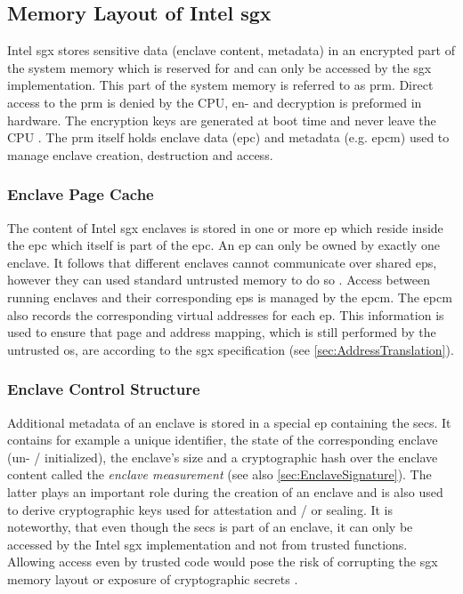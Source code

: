\subsection{Memory Layout of Intel \ac{sgx}}
Intel \ac{sgx} stores sensitive data (enclave content, metadata) in an encrypted part of the system memory which is reserved for and can only be accessed by the \ac{sgx} 
implementation. This part of the system memory is referred to as \ac{prm}. Direct access to the \ac{prm} is denied by the CPU, en- and decryption 
is preformed in hardware. The encryption keys are generated at boot time and never leave the CPU \cite{IntelSGXExplanation}. The \ac{prm} itself holds enclave data (\ac{epc}) and metadata (e.g. \ac{epcm}) used to manage enclave creation, destruction and access.

\subsubsection{Enclave Page Cache}
The content of Intel \ac{sgx} enclaves is stored in one or more \ac{ep} which reside inside the \ac{epc} which itself is part of the \ac{epc}. An \ac{ep}
can only be owned by exactly one enclave. It follows that different enclaves cannot communicate over shared \acp{ep}, however they can used standard untrusted memory to
do so \cite{Costan2016IntelSE}. Access between running enclaves and their corresponding \acp{ep} is managed by the \ac{epcm}. The \ac{epcm} also records
the corresponding virtual addresses for each \ac{ep}. This information is used to ensure that page and address mapping, which is still performed by the untrusted \ac{os}, 
are according to the \ac{sgx} specification (see \cref{sec:AddressTranslation}). 

\subsubsection{Enclave Control Structure}
Additional metadata of an enclave is stored in a special \ac{ep} containing the \ac{secs}. It contains for example a unique identifier, the
state of the corresponding enclave (un- / initialized), the enclave's size and a cryptographic hash over the enclave content called the \textit{enclave measurement} (see
also \cref{sec:EnclaveSignature}). The latter plays an important role during the creation of an enclave and is also used to derive cryptographic keys used for attestation 
and / or sealing. It is noteworthy, that even though the \ac{secs} is part of an enclave, it can only be accessed by the Intel \ac{sgx} implementation and not from trusted functions. 
Allowing access even by trusted code would pose the risk of corrupting the \ac{sgx} memory layout or exposure of cryptographic secrets \cite{Costan2016IntelSE}.


